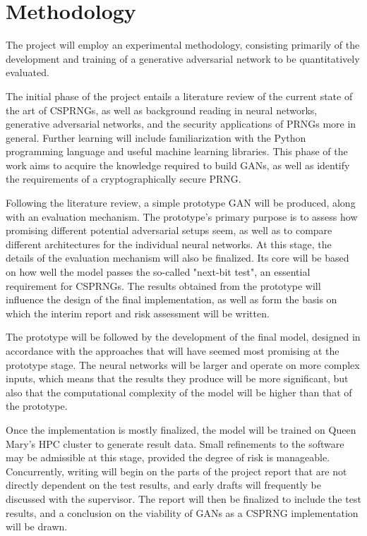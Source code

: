 \documentclass[12pt, titlepage]{article}
\begin{document}
\section{Methodology}
The project will employ an experimental methodology, consisting primarily
of the development and training of a generative adversarial network to be
quantitatively evaluated.

The initial phase of the project entails a literature review of the current
state of the art of CSPRNGs, as well as background reading in neural
networks, generative adversarial networks, and the security applications of
PRNGs more in general. Further learning will include familiarization with the
Python programming language and useful machine learning libraries.
This phase of the work aims to acquire the knowledge required to
build GANs, as well as identify the requirements of a cryptographically secure
PRNG.

Following the literature review, a simple prototype GAN will be produced, along
with an evaluation mechanism. The prototype's primary purpose is to assess how
promising different potential adversarial setups seem, as well as to compare different
architectures for the individual neural networks. At this stage, the details of
the evaluation mechanism will also be finalized. Its core will be based on how
well the model passes the so-called "next-bit test", an essential requirement for
CSPRNGs. The results obtained from the prototype will influence the design of
the final implementation, as well as form the basis on which the interim
report and risk assessment will be written.

The prototype will be followed by the development of the final model, designed
in accordance with the approaches that will have seemed most promising at the
prototype stage. The neural networks will be larger and operate on more complex
inputs, which means that the results they produce will be more significant,
but also that the computational complexity of the model will be higher than
that of the prototype.

Once the implementation is mostly finalized, the model will be trained on Queen
Mary's HPC cluster to generate result data. Small refinements to the software
may be admissible at this stage, provided the degree of risk is manageable.
Concurrently, writing will begin on the parts of the project report that are
not directly dependent on the test results, and early drafts will
frequently be discussed with the supervisor. The report will then be finalized
to include the test results, and a conclusion on the viability of GANs
as a CSPRNG implementation will be drawn.
\end{document}
